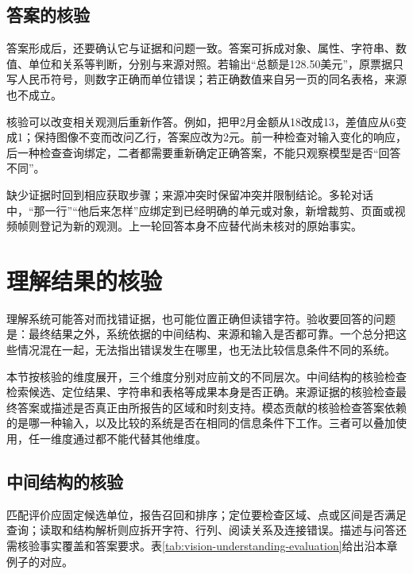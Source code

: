 \subsection{答案的核验}
\label{sec:vision-understanding-answer-check}

答案形成后，还要确认它与证据和问题一致。答案可拆成对象、属性、字符串、数值、单位和关系等判断，分别与来源对照。若输出“总额是128.50美元”，原票据只写人民币符号，则数字正确而单位错误；若正确数值来自另一页的同名表格，来源也不成立。

核验可以改变相关观测后重新作答。例如，把甲2月金额从18改成13，差值应从6变成1；保持图像不变而改问乙行，答案应改为2元。前一种检查对输入变化的响应，后一种检查查询绑定，二者都需要重新确定正确答案，不能只观察模型是否“回答不同”。

缺少证据时回到相应获取步骤；来源冲突时保留冲突并限制结论。多轮对话中，“那一行”“他后来怎样”应绑定到已经明确的单元或对象，新增裁剪、页面或视频帧则登记为新的观测。上一轮回答本身不应替代尚未核对的原始事实。

\section{理解结果的核验}
\label{sec:vision-understanding-evaluation}

理解系统可能答对而找错证据，也可能位置正确但读错字符。验收要回答的问题是：最终结果之外，系统依据的中间结构、来源和输入是否都可靠。一个总分把这些情况混在一起，无法指出错误发生在哪里，也无法比较信息条件不同的系统。

本节按核验的维度展开，三个维度分别对应前文的不同层次。中间结构的核验检查检索候选、定位结果、字符串和表格等成果本身是否正确。来源证据的核验检查最终答案或描述是否真正由所报告的区域和时刻支持。模态贡献的核验检查答案依赖的是哪一种输入，以及比较的系统是否在相同的信息条件下工作。三者可以叠加使用，任一维度通过都不能代替其他维度。

\subsection{中间结构的核验}
\label{sec:vision-understanding-output-metrics}
\label{sec:vision-understanding-grounding-output}

匹配评价应固定候选单位，报告召回和排序；定位要检查区域、点或区间是否满足查询；读取和结构解析则应拆开字符、行列、阅读关系及连接错误。描述与问答还需核验事实覆盖和答案要求。表\ref{tab:vision-understanding-evaluation}给出沿本章例子的对应。

